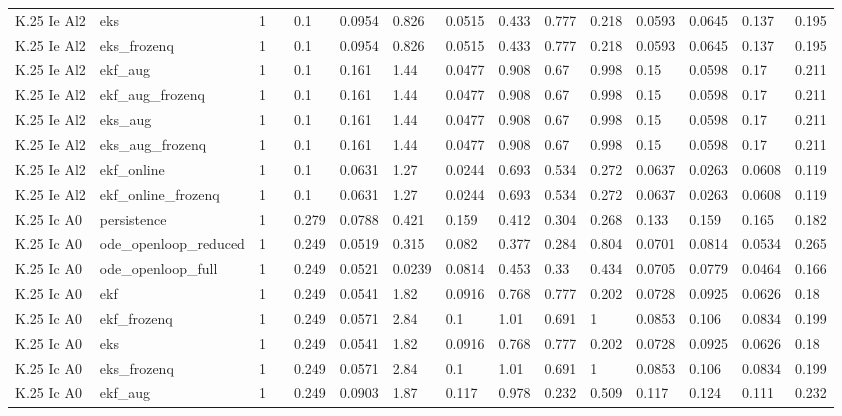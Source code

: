 \begin{table}[t]
\begin{tabular}{lllllllllllllll}
K.25 Ie Al2 & eks & 1 &  & 0.1 & 0.0954 & 0.826 & 0.0515 & 0.433 & 0.777 & 0.218 & 0.0593 & 0.0645 & 0.137 & 0.195 \\
K.25 Ie Al2 & eks\_frozenq & 1 &  & 0.1 & 0.0954 & 0.826 & 0.0515 & 0.433 & 0.777 & 0.218 & 0.0593 & 0.0645 & 0.137 & 0.195 \\
K.25 Ie Al2 & ekf\_aug & 1 &  & 0.1 & 0.161 & 1.44 & 0.0477 & 0.908 & 0.67 & 0.998 & 0.15 & 0.0598 & 0.17 & 0.211 \\
K.25 Ie Al2 & ekf\_aug\_frozenq & 1 &  & 0.1 & 0.161 & 1.44 & 0.0477 & 0.908 & 0.67 & 0.998 & 0.15 & 0.0598 & 0.17 & 0.211 \\
K.25 Ie Al2 & eks\_aug & 1 &  & 0.1 & 0.161 & 1.44 & 0.0477 & 0.908 & 0.67 & 0.998 & 0.15 & 0.0598 & 0.17 & 0.211 \\
K.25 Ie Al2 & eks\_aug\_frozenq & 1 &  & 0.1 & 0.161 & 1.44 & 0.0477 & 0.908 & 0.67 & 0.998 & 0.15 & 0.0598 & 0.17 & 0.211 \\
K.25 Ie Al2 & ekf\_online & 1 &  & 0.1 & 0.0631 & 1.27 & 0.0244 & 0.693 & 0.534 & 0.272 & 0.0637 & 0.0263 & 0.0608 & 0.119 \\
K.25 Ie Al2 & ekf\_online\_frozenq & 1 &  & 0.1 & 0.0631 & 1.27 & 0.0244 & 0.693 & 0.534 & 0.272 & 0.0637 & 0.0263 & 0.0608 & 0.119 \\
K.25 Ic A0 & persistence & 1 &  & 0.279 & 0.0788 & 0.421 & 0.159 & 0.412 & 0.304 & 0.268 & 0.133 & 0.159 & 0.165 & 0.182 \\
K.25 Ic A0 & ode\_openloop\_reduced & 1 &  & 0.249 & 0.0519 & 0.315 & 0.082 & 0.377 & 0.284 & 0.804 & 0.0701 & 0.0814 & 0.0534 & 0.265 \\
K.25 Ic A0 & ode\_openloop\_full & 1 &  & 0.249 & 0.0521 & 0.0239 & 0.0814 & 0.453 & 0.33 & 0.434 & 0.0705 & 0.0779 & 0.0464 & 0.166 \\
K.25 Ic A0 & ekf & 1 &  & 0.249 & 0.0541 & 1.82 & 0.0916 & 0.768 & 0.777 & 0.202 & 0.0728 & 0.0925 & 0.0626 & 0.18 \\
K.25 Ic A0 & ekf\_frozenq & 1 &  & 0.249 & 0.0571 & 2.84 & 0.1 & 1.01 & 0.691 & 1 & 0.0853 & 0.106 & 0.0834 & 0.199 \\
K.25 Ic A0 & eks & 1 &  & 0.249 & 0.0541 & 1.82 & 0.0916 & 0.768 & 0.777 & 0.202 & 0.0728 & 0.0925 & 0.0626 & 0.18 \\
K.25 Ic A0 & eks\_frozenq & 1 &  & 0.249 & 0.0571 & 2.84 & 0.1 & 1.01 & 0.691 & 1 & 0.0853 & 0.106 & 0.0834 & 0.199 \\
K.25 Ic A0 & ekf\_aug & 1 &  & 0.249 & 0.0903 & 1.87 & 0.117 & 0.978 & 0.232 & 0.509 & 0.117 & 0.124 & 0.111 & 0.232 \\

\end{tabular}
\end{table}
